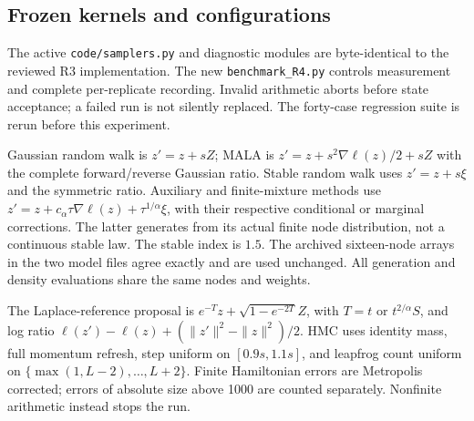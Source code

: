 \documentclass[11pt]{article}
\theoremstyle{definition}\newtheorem{definition}[theorem]{Definition}
\theoremstyle{remark}\newtheorem{remark}[theorem]{Remark}
\numberwithin{equation}{section}
\newcommand{\1}{\mathbf 1}
\begin{document}
\subsection{Frozen kernels and configurations}
The active \texttt{code/samplers.py} and diagnostic modules are byte-identical to the reviewed R3 implementation. The new \texttt{benchmark\_R4.py} controls measurement and complete per-replicate recording. Invalid arithmetic aborts before state acceptance; a failed run is not silently replaced. The forty-case regression suite is rerun before this experiment.

Gaussian random walk is $z'=z+sZ$; MALA is $z'=z+s^2\nabla\ell(z)/2+sZ$ with the complete forward/reverse Gaussian ratio. Stable random walk uses $z'=z+s\xi$ and the symmetric ratio. Auxiliary and finite-mixture methods use $z'=z+c_\alpha\tau\nabla\ell(z)+\tau^{1/\alpha}\xi$, with their respective conditional or marginal corrections. The latter generates from its actual finite node distribution, not a continuous stable law. The stable index is $1.5$. The archived sixteen-node arrays in the two model files agree exactly and are used unchanged. All generation and density evaluations share the same nodes and weights.

The Laplace-reference proposal is $e^{-T}z+\sqrt{1-e^{-2T}}Z$, with $T=t$ or $t^{2/\alpha}S$, and log ratio $\ell(z')-\ell(z)+(\|z'\|^2-\|z\|^2)/2$. HMC uses identity mass, full momentum refresh, step uniform on $[0.9s,1.1s]$, and leapfrog count uniform on $\{\max(1,L-2),\ldots,L+2\}$. Finite Hamiltonian errors are Metropolis corrected; errors of absolute size above 1000 are counted separately. Nonfinite arithmetic instead stops the run.
\end{document}
